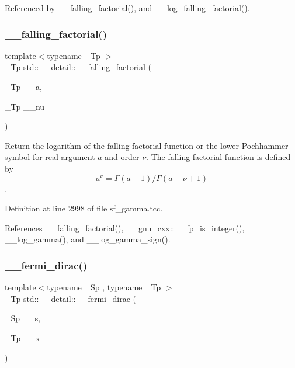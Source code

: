 Referenced by \+\_\+\+\_\+falling\+\_\+factorial(), and \+\_\+\+\_\+log\+\_\+falling\+\_\+factorial().

\mbox{\label{namespacestd_1_1____detail_a7cde2bf518e7ea3a0db2bec8f41b6465}} 
\subsubsection{\texorpdfstring{\+\_\+\+\_\+falling\+\_\+factorial()}{\_\_falling\_factorial()}\hspace{0.1cm}{\footnotesize\ttfamily [2/2]}}
{\footnotesize\ttfamily template$<$typename \+\_\+\+Tp $>$ \\
\+\_\+\+Tp std\+::\+\_\+\+\_\+detail\+::\+\_\+\+\_\+falling\+\_\+factorial (\begin{DoxyParamCaption}\item[{\+\_\+\+Tp}]{\+\_\+\+\_\+a,  }\item[{\+\_\+\+Tp}]{\+\_\+\+\_\+nu }\end{DoxyParamCaption})}



Return the logarithm of the falling factorial function or the lower Pochhammer symbol for real argument $ a $ and order $ \nu $. The falling factorial function is defined by \[ a^{\underline{\nu}} = \Gamma(a + 1) / \Gamma(a - \nu + 1) \]. 



Definition at line 2998 of file sf\+\_\+gamma.\+tcc.



References \+\_\+\+\_\+falling\+\_\+factorial(), \+\_\+\+\_\+gnu\+\_\+cxx\+::\+\_\+\+\_\+fp\+\_\+is\+\_\+integer(), \+\_\+\+\_\+log\+\_\+gamma(), and \+\_\+\+\_\+log\+\_\+gamma\+\_\+sign().

\mbox{\label{namespacestd_1_1____detail_a470e563c4e88c433f94dca391814dc61}} 
\subsubsection{\texorpdfstring{\+\_\+\+\_\+fermi\+\_\+dirac()}{\_\_fermi\_dirac()}}
{\footnotesize\ttfamily template$<$typename \+\_\+\+Sp , typename \+\_\+\+Tp $>$ \\
\+\_\+\+Tp std\+::\+\_\+\+\_\+detail\+::\+\_\+\+\_\+fermi\+\_\+dirac (\begin{DoxyParamCaption}\item[{\+\_\+\+Sp}]{\+\_\+\+\_\+s,  }\item[{\+\_\+\+Tp}]{\+\_\+\+\_\+x }\end{DoxyParamCaption})}

